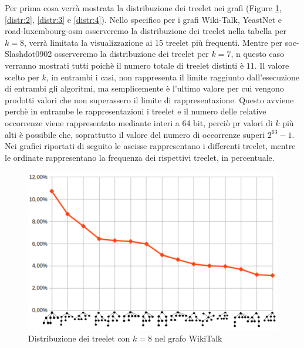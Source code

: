 Per prima cosa verrà mostrata la distribuzione dei treelet nei grafi (Figure \ref{distr:1}, \ref{distr:2}, \ref{distr:3} e \ref{distr:4}).
Nello specifico per i grafi Wiki-Talk, YeastNet e road-luxembourg-osm osserveremo la distribuzione dei treelet nella tabella per $ k = 8 $, verrà limitata la visualizzazione ai 15 treelet più frequenti.
Mentre per soc-Slashdot0902 osserveremo la distribuzione dei treelet per $ k=7 $, 
 n questo caso verranno mostrati tutti poichè il numero totale di treelet distinti è $11$.
Il valore scelto per $ k $, in entrambi i casi, non rappresenta il limite raggiunto dall'esecuzione di entrambi gli algoritmi, ma semplicemente è l'ultimo valore per cui vengono prodotti valori che non superassero il limite di rappresentazione.
Questo avviene perchè in entrambe le rappresentazioni i treelet e il numero delle relative occorrenze viene rappresentato mediante interi a 64 bit, perciò pr valori di $ k $ più alti è possibile che, soprattutto il valore del numero di occorrenze superi $2^{63}-1$.
Nei grafici riportati di seguito le ascisse rappresentano i differenti treelet, mentre le ordinate rappresentano la frequenza dei rispettivi treelet, in percentuale.
\renewcommand{\thefigure}{\arabic{figure}}
\begin{figure}[htbp]
	\centering
	\includegraphics[width=\textwidth]{capitolo4/grafoWIKI}
		\caption{Distribuzione dei treelet con $ k=8 $ nel grafo WikiTalk}
		\label{distr:1}
\end{figure}\mbox{}
\\\\\\\\\\\\
